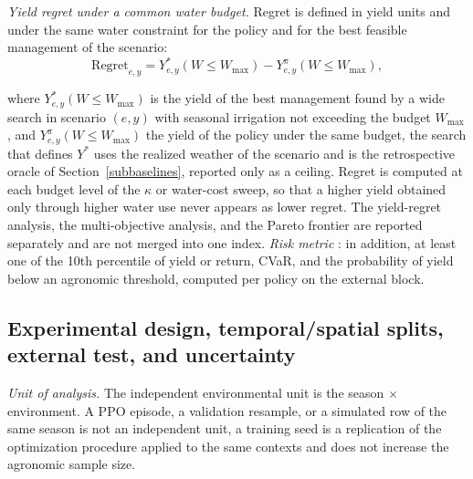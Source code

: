 \documentclass[times,final,authoryear]{elsarticle}
\begin{document}
\emph{Yield regret under a common water budget.} Regret is defined in yield units and under the same water constraint for the policy and for the best feasible management of the scenario:
\begin{equation}

\mathrm{Regret}_{e,y} = Y^{*}_{e,y}(W \leq W_{\max}) - Y^{\pi}_{e,y}(W \leq W_{\max}),

\label{eq_regret}
\end{equation}

where $Y^{*}_{e,y}(W \leq W_{\max})$ is the yield of the best management found by a wide search in scenario $(e,y)$ with seasonal irrigation not exceeding the budget $W_{\max}$, and $Y^{\pi}_{e,y}(W \leq W_{\max})$ the yield of the policy under the same budget, the search that defines $Y^{*}$ uses the realized weather of the scenario and is the retrospective oracle of Section~\ref{subbaselines}, reported only as a ceiling. Regret is computed at each budget level of the $\kappa$ or water-cost sweep, so that a higher yield obtained only through higher water use never appears as lower regret. The yield-regret analysis, the multi-objective analysis, and the Pareto frontier are reported separately and are not merged into one index. \emph{Risk metric} : in addition, at least one of the 10th percentile of yield or return, CVaR, and the probability of yield below an agronomic threshold, computed per policy on the external block.


\subsection{Experimental design, temporal/spatial splits, external test, and uncertainty}
\label{subdesign}

\emph{Unit of analysis.} The independent environmental unit is the season $\times$ environment. A PPO episode, a validation resample, or a simulated row of the same season is not an independent unit, a training seed is a replication of the optimization procedure applied to the same contexts and does not increase the agronomic sample size.
\end{document}
